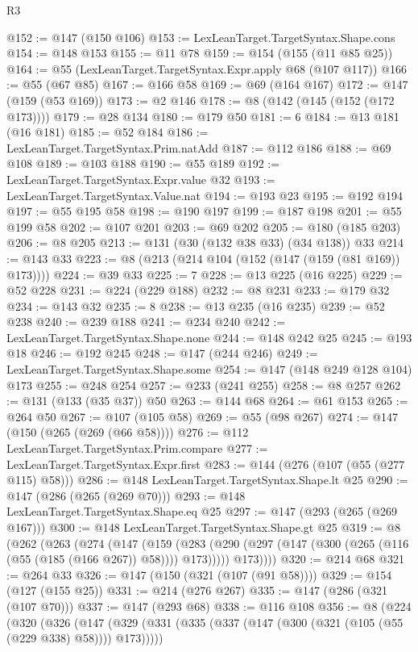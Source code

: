 \begin{lexlean}{R3}
\begin{coremodule}
{{{{{{{{{{{@152 := @147 (@150 @106)
@153 := LexLeanTarget.TargetSyntax.Shape.cons
@154 := @148 @153
@155 := @11 @78
@159 := @154 (@155 (@11 @85 @25))
@164 := @55 (LexLeanTarget.TargetSyntax.Expr.apply @68 (@107 @117))
@166 := @55 (@67 @85)
@167 := @166 @58
@169 := @69 (@164 @167)
@172 := @147 (@159 (@53 @169))
@173 := @2 @146
@178 := @8 (@142 (@145 (@152 (@172 @173))))
@179 := @28 @134
@180 := @179 @50
@181 := 6
@184 := @13 @181 (@16 @181)
@185 := @52 @184
@186 := LexLeanTarget.TargetSyntax.Prim.natAdd
@187 := @112 @186
@188 := @69 @108
@189 := @103 @188
@190 := @55 @189
@192 := LexLeanTarget.TargetSyntax.Expr.value @32
@193 := LexLeanTarget.TargetSyntax.Value.nat
@194 := @193 @23
@195 := @192 @194
@197 := @55 @195 @58
@198 := @190 @197
@199 := @187 @198
@201 := @55 @199 @58
@202 := @107 @201
@203 := @69 @202
@205 := @180 (@185 @203)
@206 := @8 @205
@213 := @131 (@30 (@132 @38 @33) (@34 @138)) @33
@214 := @143 @33
@223 := @8 (@213 (@214 @104 (@152 (@147 (@159 (@81 @169)) @173))))
@224 := @39 @33
@225 := 7
@228 := @13 @225 (@16 @225)
@229 := @52 @228
@231 := @224 (@229 @188)
@232 := @8 @231
@233 := @179 @32
@234 := @143 @32
@235 := 8
@238 := @13 @235 (@16 @235)
@239 := @52 @238
@240 := @239 @188
@241 := @234 @240
@242 := LexLeanTarget.TargetSyntax.Shape.none
@244 := @148 @242 @25
@245 := @193 @18
@246 := @192 @245
@248 := @147 (@244 @246)
@249 := LexLeanTarget.TargetSyntax.Shape.some
@254 := @147 (@148 @249 @128 @104) @173
@255 := @248 @254
@257 := @233 (@241 @255)
@258 := @8 @257
@262 := @131 (@133 (@35 @37)) @50
@263 := @144 @68
@264 := @61 @153
@265 := @264 @50
@267 := @107 (@105 @58)
@269 := @55 (@98 @267)
@274 := @147 (@150 (@265 (@269 (@66 @58))))
@276 := @112 LexLeanTarget.TargetSyntax.Prim.compare
@277 := LexLeanTarget.TargetSyntax.Expr.first
@283 := @144 (@276 (@107 (@55 (@277 @115) @58)))
@286 := @148 LexLeanTarget.TargetSyntax.Shape.lt @25
@290 := @147 (@286 (@265 (@269 @70)))
@293 := @148 LexLeanTarget.TargetSyntax.Shape.eq @25
@297 := @147 (@293 (@265 (@269 @167)))
@300 := @148 LexLeanTarget.TargetSyntax.Shape.gt @25
@319 := @8
    (@262
      (@263
        (@274
          (@147
            (@159
              (@283 (@290 (@297 (@147 (@300 (@265 (@116 (@55 (@185 (@166 @267)) @58)))) @173)))))
            @173))))
@320 := @214 @68
@321 := @264 @33
@326 := @147 (@150 (@321 (@107 (@91 @58))))
@329 := @154 (@127 (@155 @25))
@331 := @214 (@276 @267)
@335 := @147 (@286 (@321 (@107 @70)))
@337 := @147 (@293 @68)
@338 := @116 @108
@356 := @8
    (@224
      (@320
        (@326
          (@147
            (@329 (@331 (@335 (@337 (@147 (@300 (@321 (@105 (@55 (@229 @338) @58)))) @173)))))
}}}}}}}}}}}
\end{coremodule}
\end{lexlean}
